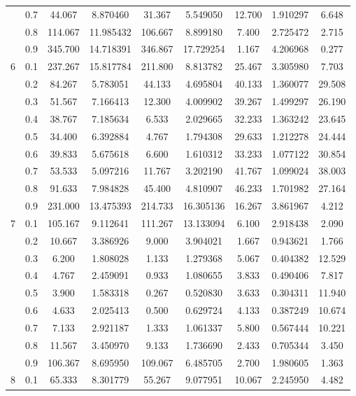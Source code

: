 \begin{longtable}{ | c | c || c | c | c | c | c | c | c | }
 & 0.7 & 44.067 & 8.870460 & 31.367 & 5.549050 & 12.700 & 1.910297 & 6.648 \\
 & 0.8 & 114.067 & 11.985432 & 106.667 & 8.899180 & 7.400 & 2.725472 & 2.715 \\
 & 0.9 & 345.700 & 14.718391 & 346.867 & 17.729254 & 1.167 & 4.206968 & 0.277 \\
 \hline
\multirow{9}{*}{6} & 0.1 & 237.267 & 15.817784 & 211.800 & 8.813782 & 25.467 & 3.305980 & 7.703 \\
 & 0.2 & 84.267 & 5.783051 & 44.133 & 4.695804 & 40.133 & 1.360077 & 29.508 \\
 & 0.3 & 51.567 & 7.166413 & 12.300 & 4.009902 & 39.267 & 1.499297 & 26.190 \\
 & 0.4 & 38.767 & 7.185634 & 6.533 & 2.029665 & 32.233 & 1.363242 & 23.645 \\
 & 0.5 & 34.400 & 6.392884 & 4.767 & 1.794308 & 29.633 & 1.212278 & 24.444 \\
 & 0.6 & 39.833 & 5.675618 & 6.600 & 1.610312 & 33.233 & 1.077122 & 30.854 \\
 & 0.7 & 53.533 & 5.097216 & 11.767 & 3.202190 & 41.767 & 1.099024 & 38.003 \\
 & 0.8 & 91.633 & 7.984828 & 45.400 & 4.810907 & 46.233 & 1.701982 & 27.164 \\
 & 0.9 & 231.000 & 13.475393 & 214.733 & 16.305136 & 16.267 & 3.861967 & 4.212 \\
 \hline
\multirow{9}{*}{7} & 0.1 & 105.167 & 9.112641 & 111.267 & 13.133094 & 6.100 & 2.918438 & 2.090 \\
 & 0.2 & 10.667 & 3.386926 & 9.000 & 3.904021 & 1.667 & 0.943621 & 1.766 \\
 & 0.3 & 6.200 & 1.808028 & 1.133 & 1.279368 & 5.067 & 0.404382 & 12.529 \\
 & 0.4 & 4.767 & 2.459091 & 0.933 & 1.080655 & 3.833 & 0.490406 & 7.817 \\
 & 0.5 & 3.900 & 1.583318 & 0.267 & 0.520830 & 3.633 & 0.304311 & 11.940 \\
 & 0.6 & 4.633 & 2.025413 & 0.500 & 0.629724 & 4.133 & 0.387249 & 10.674 \\
 & 0.7 & 7.133 & 2.921187 & 1.333 & 1.061337 & 5.800 & 0.567444 & 10.221 \\
 & 0.8 & 11.567 & 3.450970 & 9.133 & 1.736690 & 2.433 & 0.705344 & 3.450 \\
 & 0.9 & 106.367 & 8.695950 & 109.067 & 6.485705 & 2.700 & 1.980605 & 1.363 \\
 \hline
\multirow{9}{*}{8} & 0.1 & 65.333 & 8.301779 & 55.267 & 9.077951 & 10.067 & 2.245950 & 4.482 \\

\end{longtable}
